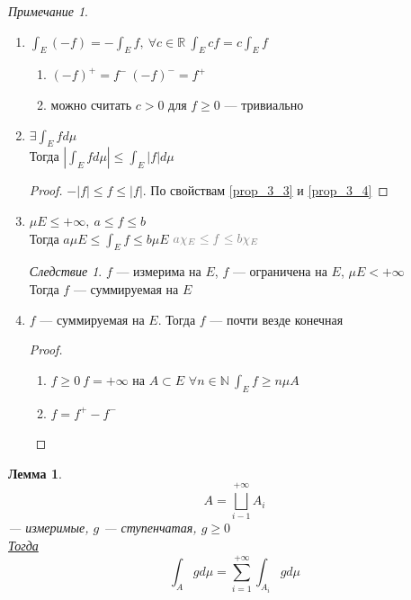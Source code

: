 \documentclass[russ,oneside]{book}
\newcommand{\R}{\mathbb{R}}
\newcommand{\N}{\mathbb{N}}
\theoremstyle{plain}
\newtheorem{lemma}{Лемма}
\theoremstyle{remark}
\newtheorem*{remark}{Примечание}
\newtheorem{corollary}{Следствие}[theorem]
\theoremstyle{definition}
\begin{document}
\begin{remark}
\begin{enumerate}
\emph{Змечание}: \\
\(f\) --- измеримая. Тогда \(f\) --- суммируемая \(\Leftrightarrow\) \(\int |f| < + \infty\) \\
\begin{description}
\item[{\((\Leftarrow)\)}] следует из cвойства \ref{prop_3_1}. \(f^+, f^- \le |f|\)
\item[{\((\Rightarrow)\label{remark_3_1_proof}\)}] позже
\end{description}
\item \label{prop_3_4} \(\int_E(-f) = -\int_E f,\ \forall c \in \R\ \int_E c f = c\int_E f\) \\
\begin{enumerate}
\item \((-f)^+ = f^-\ (-f)^- = f^+\)
\item можно считать \(c > 0\) для \(f \ge 0\) --- тривиально
\end{enumerate}
\item \(\exists \int_E f d\mu\) \\
Тогда \(|\int_E f d\mu| \le \int_E |f| d\mu\)
\begin{proof}
\(-|f| \le f \le |f|\). По свойствам \ref{prop_3_3} и \ref{prop_3_4}
\end{proof}
\item \(\mu E \le +\infty,\ a\le f\le b\) \\
Тогда \(a\mu E \le \int_E f \le b \mu E\)
\(\color{gray} a\chi_E \le f \le b\chi_E\)
\begin{corollary}
\(f\) --- измерима на \(E\), \(f\) --- ограничена на \(E\), \(\mu E < + \infty\) \\
Тогда \(f\) --- суммируемая на \(E\)
\end{corollary}
\item \(f\) --- суммируемая на \(E\). Тогда \(f\) --- почти везде конечная
\begin{proof}
\-
\begin{enumerate}
\item \(f \ge 0\ f = + \infty\) на \(A \subset E\) \(\forall n \in \N\ \int_E f \ge n\mu A\)
\item \(f = f^+ - f^-\)
\end{enumerate}
\end{proof}
\end{enumerate}
\end{remark}
\begin{lemma}
\label{lemma_3_1}
\[ A = \bigsqcup_{i - 1}^{ + \infty} A_i \]
--- измеримые, \(g\) --- ступенчатая, \(g \ge 0\) \\
\uline{Тогда} \[ \int_A g d\mu = \sum_{i = 1}^{ + \infty}\int_{A_i}g d\mu \]
\end{lemma}
\end{document}
